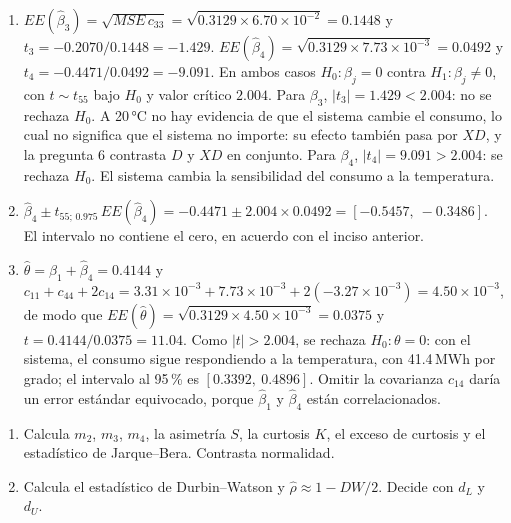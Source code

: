 \begin{solucion}
\begin{enumerate}
  \item $EE(\hat\beta_3)=\sqrt{MSE\,c_{33}}=\sqrt{0.3129\times6.70\times10^{-2}}=0.1448$ y $t_3=-0.2070/0.1448=-1.429$. $EE(\hat\beta_4)=\sqrt{0.3129\times7.73\times10^{-3}}=0.0492$ y $t_4=-0.4471/0.0492=-9.091$. En ambos casos $H_0:\beta_j=0$ contra $H_1:\beta_j\neq0$, con $t\sim t_{55}$ bajo $H_0$ y valor crítico $2.004$. Para $\beta_3$, $|t_3|=1.429<2.004$: no se rechaza $H_0$. A 20\,°C no hay evidencia de que el sistema cambie el consumo, lo cual no significa que el sistema no importe: su efecto también pasa por $XD$, y la pregunta 6 contrasta $D$ y $XD$ en conjunto. Para $\beta_4$, $|t_4|=9.091>2.004$: se rechaza $H_0$. El sistema cambia la sensibilidad del consumo a la temperatura.
  \item $\hat\beta_4\pm t_{55;\,0.975}\,EE(\hat\beta_4)=-0.4471\pm2.004\times0.0492=[-0.5457,\ -0.3486]$. El intervalo no contiene el cero, en acuerdo con el inciso anterior.
  \item $\hat\theta=\hat\beta_1+\hat\beta_4=0.4144$ y $c_{11}+c_{44}+2c_{14}=3.31\times10^{-3}+7.73\times10^{-3}+2(-3.27\times10^{-3})=4.50\times10^{-3}$, de modo que $EE(\hat\theta)=\sqrt{0.3129\times4.50\times10^{-3}}=0.0375$ y $t=0.4144/0.0375=11.04$. Como $|t|>2.004$, se rechaza $H_0:\theta=0$: con el sistema, el consumo sigue respondiendo a la temperatura, con 41.4\,MWh por grado; el intervalo al 95\,\% es $[0.3392,\ 0.4896]$. Omitir la covarianza $c_{14}$ daría un error estándar equivocado, porque $\hat\beta_1$ y $\hat\beta_4$ están correlacionados.
\end{enumerate}
\end{solucion}

\begin{enumerate}
  \item Calcula $m_2$, $m_3$, $m_4$, la asimetría $S$, la curtosis $K$, el exceso de curtosis y el estadístico de Jarque--Bera. Contrasta normalidad.
  \item Calcula el estadístico de Durbin--Watson y $\hat\rho\approx1-DW/2$. Decide con $d_L$ y $d_U$.
\end{enumerate}

